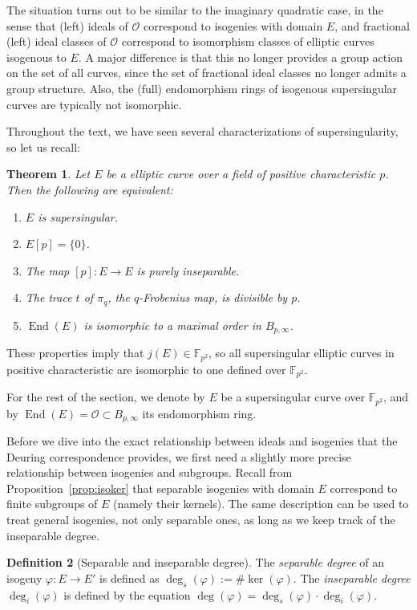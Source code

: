 \documentclass[10pt]{article}
\theoremstyle{plain}
\newtheorem{theorem}{Theorem}
\theoremstyle{definition}
\newtheorem{definition}[theorem]{Definition}
\DeclareMathOperator{\End}{End} %
\def\F{\ensuremath{\mathbb{F}}}
\def\O{\ensuremath{\mathcal{O}}}
\begin{document}
The situation turns out to be similar to the imaginary quadratic case,
in the sense that (left) ideals of $\O$ correspond to isogenies
with domain $E$, and fractional (left) ideal classes of $\O$
correspond to isomorphism classes of elliptic curves isogenous to $E$.
A major difference is that this no longer provides a group action
on the set of all curves, since the set of fractional ideal classes
no longer admits a group structure.
Also, the (full) endomorphism rings of isogenous supersingular
curves are typically not isomorphic. %

Throughout the text, we have seen several characterizations
of supersingularity, so let us recall:

\begin{theorem}
Let $E$ be a elliptic curve over a field of positive characteristic $p$.
Then the following are equivalent:
\begin{enumerate}
    \item $E$ is supersingular.
    \item $E[p] = \{0\}$.
    \item The map $[p]:E\to E$ is purely inseparable.
    \item The trace $t$ of $\pi_q$, the $q$-Frobenius map,
    is divisible by $p$.
    \item $\End(E)$ is isomorphic to a maximal order in $B_{p,\infty}$.
\end{enumerate}
\end{theorem}

These properties imply that $j(E)\in\F_{p^2}$, %
so all supersingular elliptic curves in positive characteristic
are isomorphic to one defined over $\F_{p^2}$.

For the rest of the section, we denote by $E$ be a supersingular
curve over $\F_{p^2}$, and by $\End(E)=\O\subset B_{p,\infty}$ its
endomorphism ring.

Before we dive into the exact relationship between ideals and isogenies
that the Deuring correspondence provides, we first need a slightly more
precise relationship between isogenies and subgroups.
Recall from Proposition~\ref{prop:isoker} that separable isogenies
with domain $E$ correspond to finite subgroups of $E$ (namely their kernels).
The same description can be used to treat general isogenies, not only
separable ones, as long as we keep track of the inseparable degree.

\begin{definition}[Separable and inseparable degree]
The \emph{separable degree} of an isogeny $\varphi:E\to E'$ is defined as
$\deg_s(\varphi):= \#\ker(\varphi)$.
The \emph{inseparable degree} $\deg_i(\varphi)$ is defined
by the equation
$\deg(\varphi) = \deg_s(\varphi) \cdot \deg_i(\varphi)$.
\end{definition}
\end{document}

